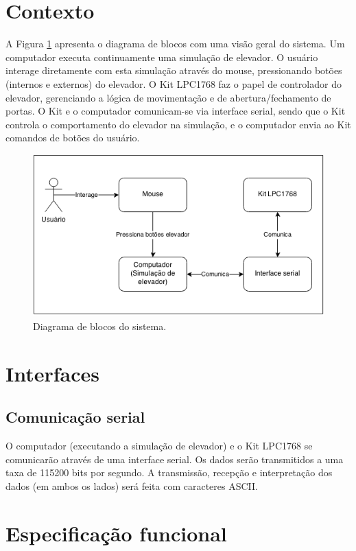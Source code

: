 \section{Contexto}

A Figura \ref{fig:diagrama_blocos} apresenta o diagrama de blocos com uma visão geral do sistema. Um computador executa continuamente uma simulação de elevador. O usuário interage diretamente com esta simulação através do mouse, pressionando botões (internos e externos) do elevador. O Kit LPC1768 faz o papel de controlador do elevador, gerenciando a lógica de movimentação e de abertura/fechamento de portas. O Kit e o computador comunicam-se via interface serial, sendo que o Kit controla o comportamento do elevador na simulação, e o computador envia ao Kit comandos de botões do usuário. 

\begin{figure}[h]
    \centering
    \includegraphics[width=0.8\columnwidth]{./figures/diagrama_blocos.png}
    \caption{Diagrama de blocos do sistema.}
    \label{fig:diagrama_blocos}
\end{figure}


\section{Interfaces}

\subsection{Comunicação serial}
O computador (executando a simulação de elevador) e o Kit LPC1768 se comunicarão através de uma interface serial. Os dados serão transmitidos a uma taxa de 115200 bits por segundo. A transmissão, recepção e interpretação dos dados (em ambos os lados) será feita com caracteres ASCII.


\section{Especificação funcional}
\label{sec:espec_funcional}



